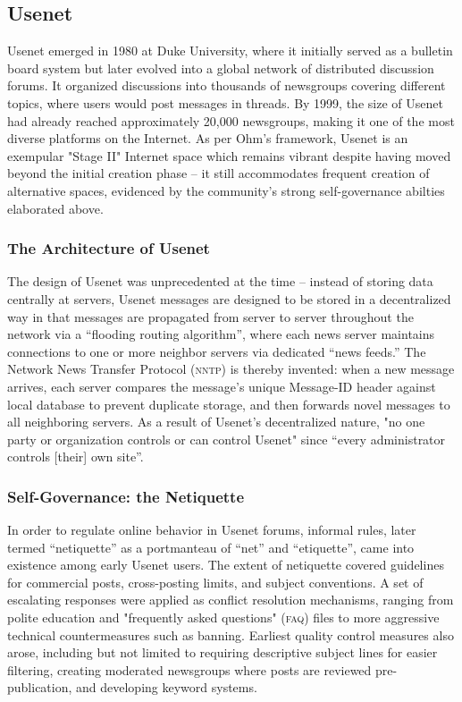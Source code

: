\subsection{Usenet}

Usenet emerged in 1980 at Duke University, where it initially served as a
bulletin board system but later evolved into a global network of distributed
discussion forums.\cite{HowUseUsenet} It organized discussions into thousands of
newsgroups covering different topics, where users would post messages in
threads. By 1999, the size of Usenet had already reached approximately 20,000
newsgroups, making it one of the most diverse platforms on the Internet.
As per Ohm's framework, Usenet is an exempular "Stage II" Internet space which remains vibrant despite having moved beyond the initial creation phase -- it still accommodates frequent creation of alternative spaces, evidenced by the community's strong self-governance abilties elaborated above.\cite{ohmRegulatingInternetUsenet1998}

\subsubsection{The Architecture of Usenet} The design of
Usenet was unprecedented at the time -- instead of storing data centrally at
servers, Usenet messages are designed to be stored in a decentralized way in
that messages are propagated from server to server throughout the network via a
``flooding routing algorithm'', where each news server maintains connections to
one or more neighbor servers via dedicated ``news feeds.'' \cite{HowUseUsenet}
The Network News Transfer Protocol (\textsc{nntp}) is thereby invented: when a
new message arrives, each server compares the message's unique Message-ID header
against local database to prevent duplicate storage, and then forwards novel
messages to all neighboring servers. As a result of Usenet's decentralized
nature, "no one party or organization controls or can control Usenet" since
``every administrator controls [their] own site''.

\subsubsection{Self-Governance: the Netiquette}

In order to regulate online behavior in Usenet forums, informal rules, later
termed ``netiquette'' as a portmanteau of ``net'' and ``etiquette'', came into
existence among early Usenet users.\cite{HowUseUsenet} The extent of netiquette
covered guidelines for commercial posts, cross-posting limits, and subject
conventions. A set of escalating responses were applied as conflict resolution
mechanisms, ranging from polite education and "frequently asked questions"
(\textsc{faq}) files to more aggressive technical countermeasures such as
banning. Earliest quality control measures also arose, including but not limited
to requiring descriptive subject lines for easier filtering, creating moderated
newsgroups where posts are reviewed pre-publication, and developing keyword
systems.

